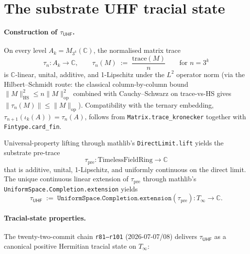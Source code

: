 \documentclass[11pt,a4paper]{amsart}
\theoremstyle{plain}
\theoremstyle{definition}
\begin{document}
\section{The substrate UHF tracial state}\label{sec:trace}

\paragraph{Construction of $\tau_{\textsf{UHF}}$.} On every level $A_k = M_{3^k}(\mathbb{C})$, the normalised matrix trace
\[
\tau_n \colon A_k \to \mathbb{C}, \qquad \tau_n(M) \;:=\; \frac{\mathrm{trace}(M)}{n} \qquad \text{for } n = 3^k
\]
is $\mathbb{C}$-linear, unital, additive, and 1-Lipschitz under the $L^2$ operator norm (via the Hilbert--Schmidt route: the classical column-by-column bound $\|M\|_{\mathrm{HS}}^2 \le n \|M\|_{\mathrm{op}}^2$ combined with Cauchy--Schwarz on trace-vs-HS gives $\|\tau_n(M)\| \le \|M\|_{\mathrm{op}}$). Compatibility with the ternary embedding, $\tau_{n+1}(\iota_k(A)) = \tau_n(A)$, follows from \texttt{Matrix.trace\_kronecker} together with \texttt{Fintype.card\_fin}.

Universal-property lifting through mathlib's \texttt{DirectLimit.lift} yields the substrate pre-trace
\[
\tau_{\mathrm{pre}} \colon \mathrm{TimelessFieldRing} \to \mathbb{C}
\]
that is additive, unital, 1-Lipschitz, and uniformly continuous on the direct limit. The unique continuous linear extension of $\tau_{\mathrm{pre}}$ through mathlib's \texttt{UniformSpace.Completion.extension} yields
\[
\tau_{\textsf{UHF}} \;:=\; \texttt{UniformSpace.Completion.extension}(\tau_{\mathrm{pre}}) \colon T_\infty \to \mathbb{C}.
\]

\paragraph{Tracial-state properties.} The twenty-two-commit chain \texttt{r81--r101} (2026-07-07/08) delivers $\tau_{\textsf{UHF}}$ as a canonical positive Hermitian tracial state on $T_\infty$:
\end{document}
